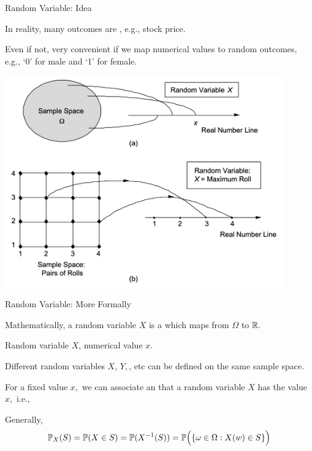 \documentclass[handout,fleqn,aspectratio=169]{beamer}
\begin{document}
\begin{frame}{Random Variable: Idea}


{
\plitemsep 0.1in

\bci 
\item In reality, many outcomes are , e.g., stock price.

\item Even if not, very convenient if we map numerical values to random outcomes, e.g., `0' for male and `1' for female.

\eci 
}
{
\centering
\includegraphics[width=0.9\textwidth]{L6_RV_ex.png}
}

\end{frame}

\begin{frame}{Random Variable: More Formally}

\plitemsep 0.1in

\bci
\item Mathematically, a random variable $X$ is a  which maps from $\Omega$ to ${\mathbb R}.$

\item {} Random variable $X$, numerical value $x.$

\item Different random variables $X$, $Y,$, etc can be defined on the same sample space. 

\item For a fixed value $x,$ we can associate an  that a random variable $X$ has the value $x,$ i.e., 



\item Generally,
$$
\mathbb{P}_{X}( S ) = \mathbb{P}( X \in S ) = \mathbb{P}( {{X}^{-1}}(S) ) = \mathbb{P}\Bigl( \{ \omega \in \Omega : X(w) \in S \} \Bigr)
$$


\eci 

\end{frame}
\end{document}
